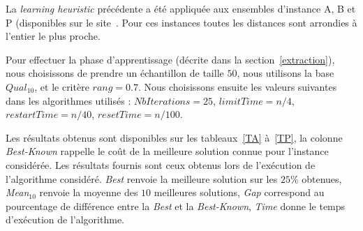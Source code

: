 \documentclass[a4paper,11pt]{article}%
\begin{document}
La \emph{learning heuristic} précédente a été appliquée aux ensembles d'instance A, B et P (disponibles sur le site~\cite{cvrplib}.
Pour ces instances toutes les distances sont arrondies à l'entier le plus proche.

Pour effectuer la phase d'apprentissage (décrite dans la section~\ref{extraction}), nous choisissons de prendre un échantillon de taille $50$, nous utilisons la base $Qual_{10}$, et le critère $ rang = 0.7$. Nous choisissons ensuite les valeurs suivantes dans les algorithmes utilisés : $ NbIterations = 25$, $limitTime = n/4$, $restartTime = n/40$, $resetTime = n/100$.

Les résultats obtenus sont disponibles sur les tableaux~\ref{TA} à~\ref{TP}, la colonne \emph{Best-Known} rappelle le coût de la meilleure solution connue pour l'instance considérée. 
Les résultats fournis sont ceux obtenus lors de l'exécution de l'algorithme considéré.
\emph{Best} renvoie la meilleure solution sur les $25\%$ obtenues, \emph{Mean$_{10}$} renvoie la moyenne des $10$ meilleures solutions, \emph{Gap} correspond au pourcentage de différence entre la \emph{Best} et la \emph{Best-Known}, \emph{Time} donne le temps d'exécution de l'algorithme.
\end{document}
